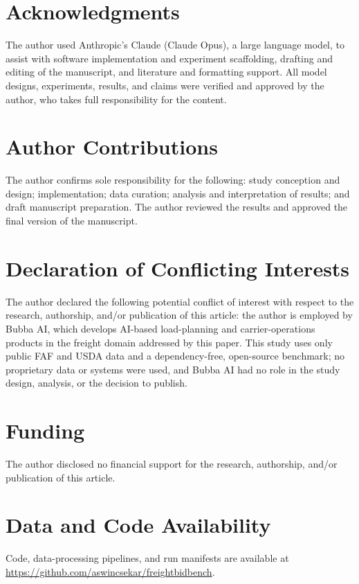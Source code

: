 \documentclass[numbered]{trbunofficial}
\begin{document}
\section*{Acknowledgments}
The author used Anthropic's Claude (Claude Opus), a large language model,
to assist with software implementation and experiment scaffolding,
drafting and editing of the manuscript, and literature and formatting
support. All model designs, experiments, results, and claims were verified
and approved by the author, who takes full responsibility for the content.

\section*{Author Contributions}
The author confirms sole responsibility for the following: study conception
and design; implementation; data curation; analysis and interpretation of
results; and draft manuscript preparation. The author reviewed the results
and approved the final version of the manuscript.

\section*{Declaration of Conflicting Interests}
The author declared the following potential conflict of interest with
respect to the research, authorship, and/or publication of this article:
the author is employed by Bubba AI, which develops AI-based load-planning
and carrier-operations products in the freight domain addressed by this
paper. This study uses only public FAF and USDA data and a
dependency-free, open-source benchmark; no proprietary data or systems were
used, and Bubba AI had no role in the study design, analysis, or the
decision to publish.

\section*{Funding}
The author disclosed no financial support for the research, authorship,
and/or publication of this article.

\section*{Data and Code Availability}
Code, data-processing pipelines, and run manifests are available at
\url{https://github.com/aswincsekar/freightbidbench}.



\end{document}
